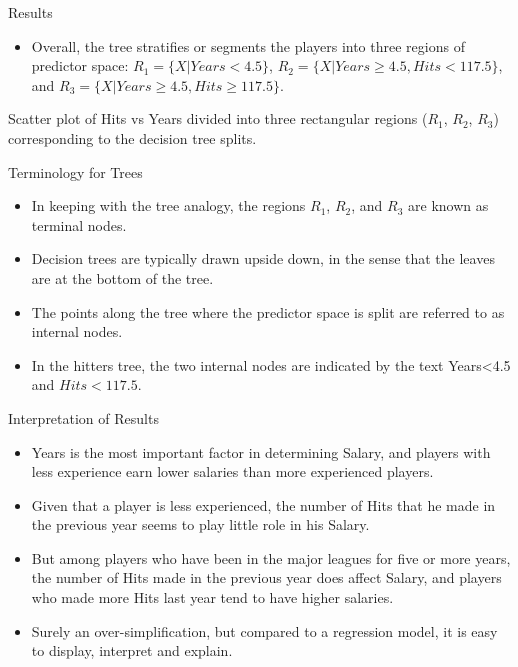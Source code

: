 \documentclass[aspectratio=169, 11pt]{beamer}
\begin{document}
\begin{frame}{Results}
\begin{itemize}
    \item Overall, the tree stratifies or segments the players into three regions of predictor space: $R_{1}=\{X|Years<4.5\}$, $R_{2}=\{X | Years \ge 4.5, Hits<117.5\}$, and $R_{3}=\{X| Years \ge 4.5, Hits \ge 117.5\}$.
\end{itemize}
\begin{tcolorbox}[colback=LightGray,title=Figure]
Scatter plot of Hits vs Years divided into three rectangular regions ($R_1$, $R_2$, $R_3$) corresponding to the decision tree splits.
\end{tcolorbox}
\end{frame}

\begin{frame}{Terminology for Trees}
\begin{itemize}
    \item In keeping with the tree analogy, the regions $R_{1}$, $R_{2}$, and $R_{3}$ are known as terminal nodes.
    \item Decision trees are typically drawn upside down, in the sense that the leaves are at the bottom of the tree.
    \item The points along the tree where the predictor space is split are referred to as internal nodes.
    \item In the hitters tree, the two internal nodes are indicated by the text Years<4.5 and $Hits<117.5$.
\end{itemize}
\end{frame}

\begin{frame}{Interpretation of Results}
\begin{itemize}
    \item Years is the most important factor in determining Salary, and players with less experience earn lower salaries than more experienced players.
    \item Given that a player is less experienced, the number of Hits that he made in the previous year seems to play little role in his Salary.
    \item But among players who have been in the major leagues for five or more years, the number of Hits made in the previous year does affect Salary, and players who made more Hits last year tend to have higher salaries.
    \item Surely an over-simplification, but compared to a regression model, it is easy to display, interpret and explain.
\end{itemize}
\end{frame}
\end{document}
